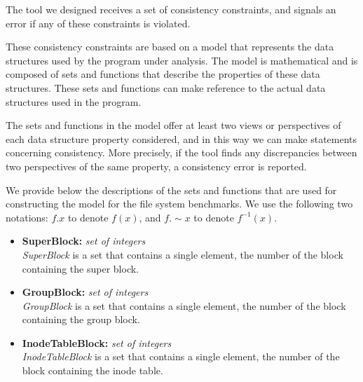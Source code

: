 \documentclass{article}
\title{}
\author{Consistency constraints}
\date{July 30, 2003}
\begin{document}
\maketitle
\begin{flushleft}
\thispagestyle{empty}

\vspace{0.5in}


The tool we designed receives a set of consistency constraints,
and signals an error if any of these constraints is violated.

\vspace{0.1in}
These consistency constraints are based on a model that represents the 
data structures used by the program under analysis.  The model is mathematical 
and is composed of sets and functions that describe the properties of these 
data structures.  These sets and functions can make reference to the actual
data structures used in the program.

\vspace{0.1in}
The sets and functions in the model offer at least two views or perspectives 
of each data structure property considered, and in this way we can make 
statements concerning consistency. More precisely, if the tool finds any 
discrepancies between two perspectives of the same property, a consistency 
error is reported. 

\vspace{0.2in}
We provide below the descriptions of the sets and functions that are used for 
constructing the model for the file system benchmarks. We use the following
two notations: $f.x$ to denote $f(x)$, and $f.\sim x$ to denote $f^{-1}(x)$.

\begin{itemize}
  \item{{\bf SuperBlock:} {\it set of integers} 
   \\ {\it SuperBlock} is a set that contains a single element, the number of 
the block containing the super block.}

  \item{{\bf GroupBlock:} {\it set of integers}
   \\ {\it GroupBlock} is a set that contains a single element, the number of 
the block containing the group block.}

  \item{{\bf InodeTableBlock:} {\it set of integers} 
  \\ {\it InodeTableBlock} is a set that contains a single element, the number 
of the block containing the inode table.}


\end{itemize}
\end{flushleft}
\end{document}
